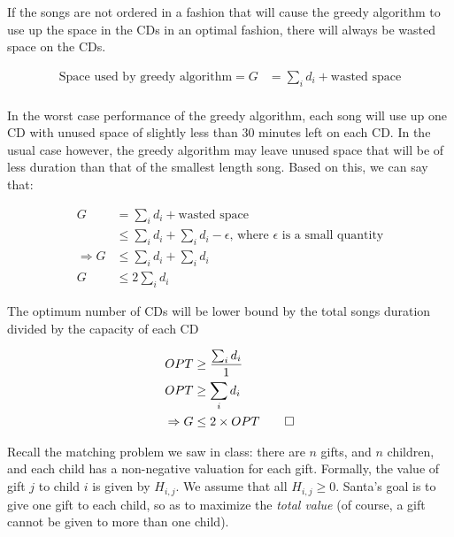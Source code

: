 \documentclass[addpoints]{exam}
\begin{document}
\begin{questions}
If  the songs are not ordered in a fashion that will cause the greedy algorithm to use up the space in the CDs in an optimal fashion, there will always be wasted space on the CDs. 

\begin{equation*}
\begin{aligned}
\text{Space used by greedy algorithm} = G &= \sum_i d_i + \text{wasted space}\\
\end{aligned}
\end{equation*}

In the worst case performance of the greedy algorithm, each song will use up one CD with unused space of slightly less than $30$ minutes left on each CD. In the usual case however, the greedy algorithm may leave unused space that will be of less duration than that of the smallest length song. Based on this, we can say that:

\begin{equation*}
\begin{aligned}
G &= \sum_i d_i + \text{wasted space}\\
&\leq \sum_i d_i + \sum_i d_i - \epsilon \text{, where $\epsilon$ is a small quantity}\\
\Rightarrow G &\leq \sum_i d_i + \sum_i d_i \\
G &\leq 2 \sum_i d_i 
\end{aligned}
\end{equation*}

The optimum number of CDs will be lower bound by the total songs duration divided by the capacity of each CD

\begin{equation*}
\begin{aligned}
OPT &\geq  \frac{\sum_i d_i }{1}\\
OPT &\geq \sum_i d_i \\
\Rightarrow G &\leq 2 \times OPT \qed
\end{aligned}
\end{equation*}

Recall the matching problem we saw in class: there are $n$ gifts, and $n$ children, and each child has a non-negative valuation for each gift. Formally, the value of gift $j$ to child $i$ is given by $H_{i,j}$.  We assume that all $H_{i,j} \ge 0$. Santa's goal is to give one gift to each child, so as to maximize the {\em total value} (of course, a gift cannot be given to more than one child).


\end{questions}
\end{document}
